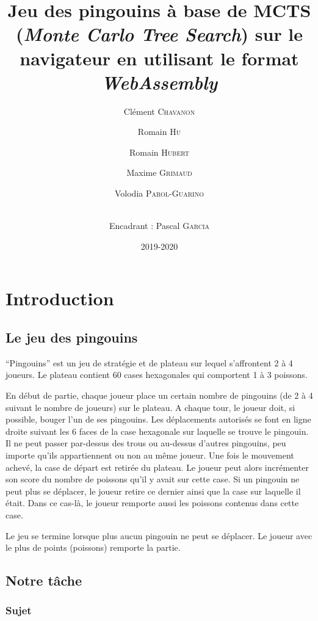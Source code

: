 \documentclass[a4paper,11pt]{article}
\title{\textbf{Jeu des pingouins à base de MCTS (\emph{Monte Carlo Tree
Search}) sur le navigateur en utilisant le format \emph{WebAssembly}}}
\author{Clément \textsc{Chavanon} \and Romain \textsc{Hu} \and Romain
\textsc{Hubert} \and Maxime \textsc{Grimaud} \and Volodia
\textsc{Parol-Guarino} \and 
 \\ Encadrant : Pascal \textsc{Garcia}}
\date{2019-2020}
\begin{document}
\maketitle
\begin{abstract}

\end{abstract}

\hypertarget{introduction}{%
\section*{Introduction}\label{introduction}}

\hypertarget{le-jeu-des-pingouins}{%
\subsection{Le jeu des pingouins}\label{le-jeu-des-pingouins}}

``Pingouins'' est un jeu de stratégie et de plateau sur lequel
s'affrontent 2 à 4 joueurs. Le plateau contient 60 cases hexagonales qui
comportent 1 à 3 poissons.

En début de partie, chaque joueur place un certain nombre de pingouins
(de 2 à 4 suivant le nombre de joueurs) sur le plateau. A chaque tour,
le joueur doit, si possible, bouger l'un de ses pingouins. Les
déplacements autorisés se font en ligne droite suivant les 6 faces de la
case hexagonale sur laquelle se trouve le pingouin. Il ne peut passer
par-dessus des trous ou au-dessus d'autres pingouins, peu importe qu'ils
appartiennent ou non au même joueur. Une fois le mouvement achevé, la
case de départ est retirée du plateau. Le joueur peut alors incrémenter
son score du nombre de poissons qu'il y avait sur cette case. Si un
pingouin ne peut plus se déplacer, le joueur retire ce dernier ainsi que
la case sur laquelle il était. Dans ce cas-là, le joueur remporte aussi
les poissons contenus dans cette case.

Le jeu se termine lorsque plus aucun pingouin ne peut se déplacer. Le
joueur avec le plus de points (poissons) remporte la partie.

\hypertarget{notre-tuxe2che}{%
\subsection{Notre tâche}\label{notre-tuxe2che}}

\hypertarget{sujet}{%
\subsubsection{Sujet}\label{sujet}}
\end{document}

